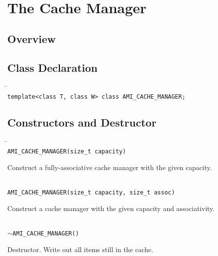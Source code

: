 
\chapter{The Cache Manager}

\section{Overview}
\label{cache:overview}

\section{Class Declaration}

   \begin{tabbing}
   \hspace*{.3in} \= \hspace{.5in} \= \\

   \> {\tt template<class T, class W> class AMI\_CACHE\_MANAGER;}
   \end{tabbing}

\section{Constructors and Destructor}
   \begin{tabbing}
   \hspace*{.3in} \= \hspace{.5in} \= \\

   \> {\tt AMI\_CACHE\_MANAGER(size\_t capacity)}\\ 
   \>\>\parbox[t]{5.5in}{Construct a fully-associative cache manager with the given capacity.}\\[3mm]

   \> {\tt AMI\_CACHE\_MANAGER(size\_t capacity, size\_t assoc)}\\ 
   \>\>\parbox[t]{5.5in}{Construct a cache manager with the given capacity and associativity.}\\[3mm]

   \> {\tt $\sim$AMI\_CACHE\_MANAGER()}\\ 
   \>\>\parbox[t]{5.5in}{Destructor. Write out all items still in the cache.}\\[3mm]

   \end{tabbing}

